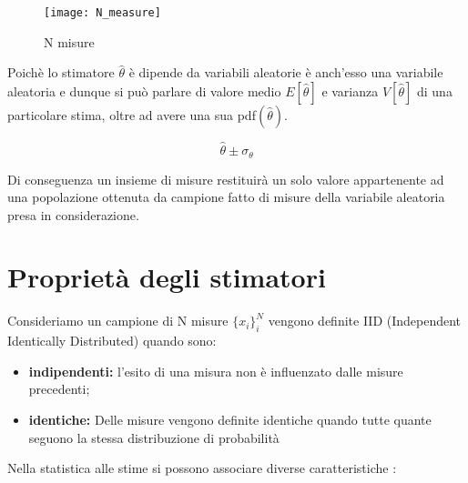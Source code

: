 \documentclass[11pt,a4paper]{book}
\begin{document}
\begin{figure}[ht]
\vspace{0.6in}
\texttt{[image: N\_measure]}	
\centering
\vspace{0.3in}
\caption{N misure}
\end{figure}

\noindent Poich\`{e} lo stimatore $\hat{\theta}$ \`{e} dipende da variabili aleatorie \`{e} anch'esso  una variabile aleatoria e dunque si pu\`{o} parlare di valore medio $E[\hat{\theta}]$ e varianza $V[\hat{\theta}]$ di una particolare stima, oltre ad avere una sua pdf$(\hat{\theta})$.

\begin{equation}
	\hat{\theta} \pm \sigma_{\theta}
\end{equation} 

Di conseguenza un insieme di misure restituir\`{a} un solo valore appartenente ad una popolazione ottenuta da campione fatto di misure della variabile aleatoria presa in considerazione.

\section{Propriet\`{a} degli stimatori}

Consideriamo un campione di N misure $\{x_i\}_i^N$ vengono definite IID (Independent Identically Distributed) quando sono:
\begin{itemize}
	\item \textbf{indipendenti:} l'esito di una misura non \`{e} influenzato dalle misure precedenti;
	\item \textbf{identiche:} Delle misure vengono definite identiche quando tutte quante seguono la stessa distribuzione di probabilit\`{a}
\end{itemize}
Nella statistica alle stime si possono associare diverse caratteristiche :
\end{document}
